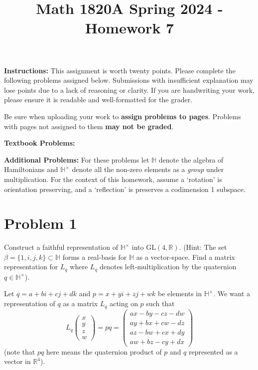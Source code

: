 \documentclass[12pt]{article}
\title{Math 1820A Spring 2024 - Homework 7}
\date{}
\newcommand{\R}{\mathbb{R}}
\newcommand{\GL}{\text{GL}}
\newcommand{\Ha}{\mathbb{H}}
\begin{document}
\maketitle
\vspace{-0.5in}
\begin{spacing}{1.5}
\noindent \textbf{Instructions:}  This assignment is worth twenty points.  Please complete the following problems assigned below.  Submissions with insufficient explanation may lose points due to a lack of reasoning or clarity.  If you are handwriting your work, please ensure it is readable and well-formatted for the grader.

Be sure when uploading your work to \textbf{assign problems to pages}.  Problems with pages not assigned to them \textbf{may not be graded}.  
\end{spacing}

\vspace{10mm}\noindent
\textbf{Textbook Problems: }  
\vspace*{10pt}

\noindent
\textbf{Additional Problems:}   For these problems let $\Ha$ denote the algebra of Hamiltonians and $\Ha^{\times}$ denote all the non-zero elements as a \emph{group} under multiplication.  For the context of this homework, assume a `rotation' is orientation preserving, and a `reflection' is preserves a codimension 1 subspace. 

\section*{Problem 1} Construct a faithful representation of $\Ha^{\times}$ into $\GL(4,\R)$.  (Hint:  The set $\beta = \{1, i, j, k\} \subset \Ha$ forms a real-basis for $\Ha$ as a vector-space.  Find a matrix representation for $L_{q}$ where $L_{q}$ denotes left-multiplication by the quaternion $q \in \Ha^{\times}$).

    \color{blue}
        Let $q = a + bi + cj + dk$ and $p = x + yi + zj + wk$ be elements in $\Ha^{\times}$. We want a representation of $q$ as a matrix $L_q$ acting on $p$ such that 
        \[L_q \begin{pmatrix}
            x\\ 
            y\\ 
            z\\ 
            w
        \end{pmatrix} = pq = \begin{pmatrix}
            ax - by - cz - dw\\ 
            ay + bx + cw - dz\\ 
            az - bw + cx + dy\\ 
            aw + bz - cy + dx
        \end{pmatrix}\]
        (note that $pq$ here means the quaternion product of $p$ and $q$ represented as a vector in $\R^4$).
\end{document}
